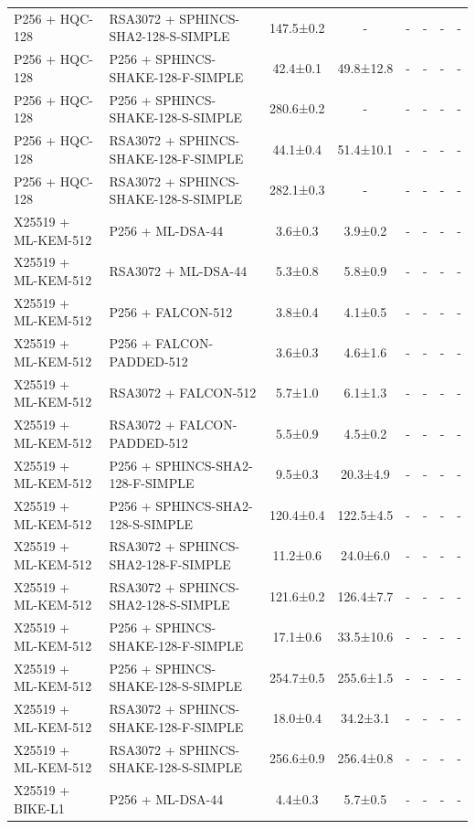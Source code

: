 \documentclass[10pt]{article}
\begin{document}
\begin{tabular}{@{}l l c c c c c c@{}}
P256 + HQC-128 & RSA3072 + SPHINCS-SHA2-128-S-SIMPLE & 147.5±0.2 & - & - & - & - & - \\
P256 + HQC-128 & P256 + SPHINCS-SHAKE-128-F-SIMPLE & 42.4±0.1 & 49.8±12.8 & - & - & - & - \\
P256 + HQC-128 & P256 + SPHINCS-SHAKE-128-S-SIMPLE & 280.6±0.2 & - & - & - & - & - \\
P256 + HQC-128 & RSA3072 + SPHINCS-SHAKE-128-F-SIMPLE & 44.1±0.4 & 51.4±10.1 & - & - & - & - \\
P256 + HQC-128 & RSA3072 + SPHINCS-SHAKE-128-S-SIMPLE & 282.1±0.3 & - & - & - & - & - \\
X25519 + ML-KEM-512 & P256 + ML-DSA-44 & 3.6±0.3 & 3.9±0.2 & - & - & - & - \\
X25519 + ML-KEM-512 & RSA3072 + ML-DSA-44 & 5.3±0.8 & 5.8±0.9 & - & - & - & - \\
X25519 + ML-KEM-512 & P256 + FALCON-512 & 3.8±0.4 & 4.1±0.5 & - & - & - & - \\
X25519 + ML-KEM-512 & P256 + FALCON-PADDED-512 & 3.6±0.3 & 4.6±1.6 & - & - & - & - \\
X25519 + ML-KEM-512 & RSA3072 + FALCON-512 & 5.7±1.0 & 6.1±1.3 & - & - & - & - \\
X25519 + ML-KEM-512 & RSA3072 + FALCON-PADDED-512 & 5.5±0.9 & 4.5±0.2 & - & - & - & - \\
X25519 + ML-KEM-512 & P256 + SPHINCS-SHA2-128-F-SIMPLE & 9.5±0.3 & 20.3±4.9 & - & - & - & - \\
X25519 + ML-KEM-512 & P256 + SPHINCS-SHA2-128-S-SIMPLE & 120.4±0.4 & 122.5±4.5 & - & - & - & - \\
X25519 + ML-KEM-512 & RSA3072 + SPHINCS-SHA2-128-F-SIMPLE & 11.2±0.6 & 24.0±6.0 & - & - & - & - \\
X25519 + ML-KEM-512 & RSA3072 + SPHINCS-SHA2-128-S-SIMPLE & 121.6±0.2 & 126.4±7.7 & - & - & - & - \\
X25519 + ML-KEM-512 & P256 + SPHINCS-SHAKE-128-F-SIMPLE & 17.1±0.6 & 33.5±10.6 & - & - & - & - \\
X25519 + ML-KEM-512 & P256 + SPHINCS-SHAKE-128-S-SIMPLE & 254.7±0.5 & 255.6±1.5 & - & - & - & - \\
X25519 + ML-KEM-512 & RSA3072 + SPHINCS-SHAKE-128-F-SIMPLE & 18.0±0.4 & 34.2±3.1 & - & - & - & - \\
X25519 + ML-KEM-512 & RSA3072 + SPHINCS-SHAKE-128-S-SIMPLE & 256.6±0.9 & 256.4±0.8 & - & - & - & - \\
X25519 + BIKE-L1 & P256 + ML-DSA-44 & 4.4±0.3 & 5.7±0.5 & - & - & - & - \\

\end{tabular}
\end{document}
